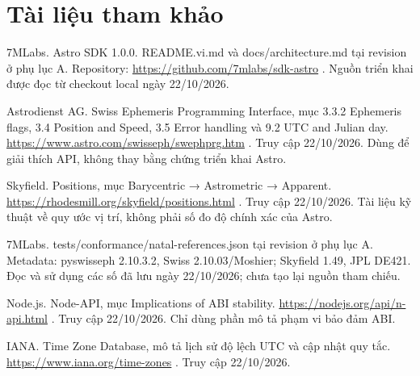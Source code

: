 \documentclass[11pt,a4paper]{article}
\begin{document}
\section*{Tài liệu tham khảo}
{\fontsize{10}{11}\selectfont\raggedright\hangindent=18pt\noindent [1] 7MLabs. Astro SDK 1.0.0. README.vi.md và docs/\allowbreak{}architecture.md tại revision ở phụ lục A. Repository: \url{https://github.com/7mlabs/sdk-astro} . Nguồn triển khai được đọc từ checkout local ngày 22/\allowbreak{}10/\allowbreak{}2026.\par}\vspace{1pt}
{\fontsize{10}{11}\selectfont\raggedright\hangindent=18pt\noindent [2] Astrodienst AG. Swiss Ephemeris Programming Interface, mục 3.3.2 Ephemeris flags, 3.4 Position and Speed, 3.5 Error handling và 9.2 UTC and Julian day. \url{https://www.astro.com/swisseph/swephprg.htm} . Truy cập 22/\allowbreak{}10/\allowbreak{}2026. Dùng để giải thích API, không thay bằng chứng triển khai Astro.\par}\vspace{1pt}
{\fontsize{10}{11}\selectfont\raggedright\hangindent=18pt\noindent [3] Skyfield. Positions, mục Barycentric → Astrometric → Apparent. \url{https://rhodesmill.org/skyfield/positions.html} . Truy cập 22/\allowbreak{}10/\allowbreak{}2026. Tài liệu kỹ thuật về quy ước vị trí, không phải số đo độ chính xác của Astro.\par}\vspace{1pt}
{\fontsize{10}{11}\selectfont\raggedright\hangindent=18pt\noindent [4] 7MLabs. tests/\allowbreak{}conformance/\allowbreak{}natal-references.json tại revision ở phụ lục A. Metadata: pyswisseph 2.10.3.2, Swiss 2.10.03/\allowbreak{}Moshier; Skyfield 1.49, JPL DE421. Đọc và sử dụng các số đã lưu ngày 22/\allowbreak{}10/\allowbreak{}2026; chưa tạo lại nguồn tham chiếu.\par}\vspace{1pt}
{\fontsize{10}{11}\selectfont\raggedright\hangindent=18pt\noindent [5] Node.js. Node-API, mục Implications of ABI stability. \url{https://nodejs.org/api/n-api.html} . Truy cập 22/\allowbreak{}10/\allowbreak{}2026. Chỉ dùng phần mô tả phạm vi bảo đảm ABI.\par}\vspace{1pt}
{\fontsize{10}{11}\selectfont\raggedright\hangindent=18pt\noindent [6] IANA. Time Zone Database, mô tả lịch sử độ lệch UTC và cập nhật quy tắc. \url{https://www.iana.org/time-zones} . Truy cập 22/\allowbreak{}10/\allowbreak{}2026.\par}\vspace{1pt}
\end{document}
